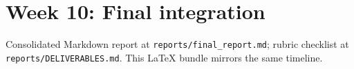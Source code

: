 \section{Week 10: Final integration}
Consolidated Markdown report at \texttt{reports/final\_report.md}; rubric checklist at \texttt{reports/DELIVERABLES.md}. This LaTeX bundle mirrors the same timeline.
